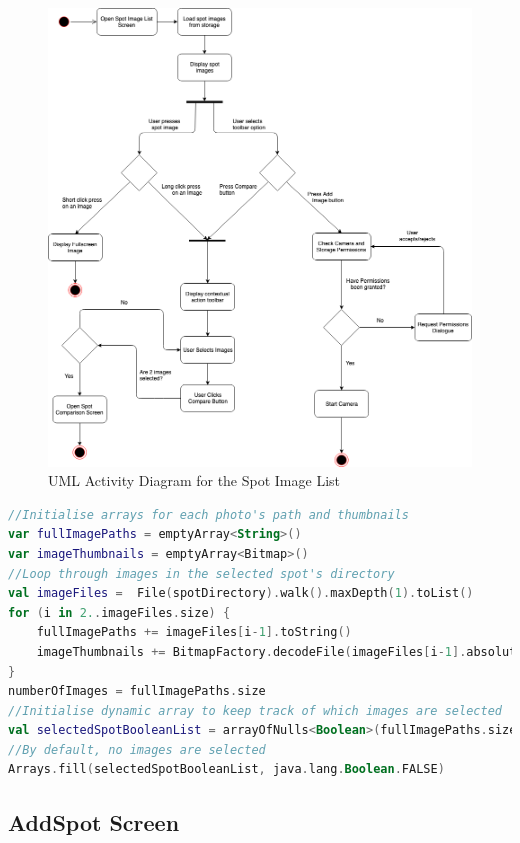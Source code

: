 \begin{figure}
    \includegraphics[width=1.2\textwidth, center]{figures/SpotImageList.png}
    \caption{UML Activity Diagram for the Spot Image List}
    \label{fig:SpotImageList}
\end{figure}
\begin{lstlisting}[caption={Loading spot images to compare}, label={lst:loadingspotimages}, language=Kotlin]
//Initialise arrays for each photo's path and thumbnails
var fullImagePaths = emptyArray<String>()
var imageThumbnails = emptyArray<Bitmap>()
//Loop through images in the selected spot's directory
val imageFiles =  File(spotDirectory).walk().maxDepth(1).toList()
for (i in 2..imageFiles.size) {
    fullImagePaths += imageFiles[i-1].toString()
    imageThumbnails += BitmapFactory.decodeFile(imageFiles[i-1].absolutePath)
}
numberOfImages = fullImagePaths.size
//Initialise dynamic array to keep track of which images are selected
val selectedSpotBooleanList = arrayOfNulls<Boolean>(fullImagePaths.size)
//By default, no images are selected 
Arrays.fill(selectedSpotBooleanList, java.lang.Boolean.FALSE)
\end{lstlisting}

\subsection{AddSpot Screen}

